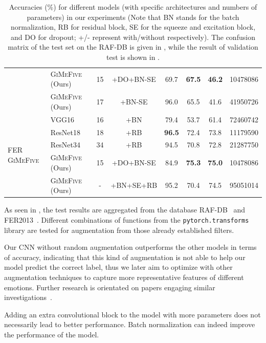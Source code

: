 \begin{table}[ht]
\begin{tabular}{@{}llcccccr@{}}
    &\textsc{GiMeFive} (Ours) & 15 & +DO+BN-SE & 69.7 & \textbf{67.5} & \textbf{46.2} & 10478086 \\
    &\textsc{GiMeFive} (Ours) & 17 & +BN-SE & 96.0 & 65.5 & 41.6 & 41950726 \\
    \midrule
    \midrule
    \multirow{5}{*}{FER \textsc{GiMeFive}} & VGG16~\cite{SimonyanZ14a} & 16 & +BN & 79.4 & 53.7 & 61.4 & 72460742 \\
    & ResNet18~\cite{HeZRS16} & 18 & +RB  & \textbf{96.5} & 72.4 & 73.8 & 11179590 \\
    & ResNet34~\cite{HeZRS16} & 34 & +RB  & 94.5 & 70.8 & 72.8 & 21287750 \\
    &\textsc{GiMeFive} (Ours) & 15 & +DO+BN-SE & 84.9 & \textbf{75.3} & \textbf{75.0} & 10478086 \\
    &\textsc{GiMeFive} (Ours) & - & +BN+SE+RB & 95.2 & 70.4 & 74.5 & 95051014 \\
    \bottomrule
  \end{tabular}
  \caption{Accuracies (\%) for different models (with specific architectures and numbers of parameters) in our experiments 
  (Note that BN stands for the batch normalization, 
  RB for residual block, 
  SE for the squeeze and excitation block, 
  and DO for dropout; 
  +/- represent with/without respectively). 
  The confusion matrix of the test set on the RAF-DB is given in , 
  while the result of validation test is shown in .} 
  \label{tab:model}
\end{table}

As seen in , 
the test results are aggregated from the database RAF-DB~\cite{kaggle_rafdb} and FER2013~\cite{kaggle_fer}.
Different combinations of functions from the \texttt{pytorch.transforms} library are tested for augmentation from those already established filters. 

Our CNN without random augmentation outperforms the other models in terms of accuracy, 
indicating that this kind of augmentation is not able to help our model predict the correct label, 
thus we later aim to optimize with other augmentation techniques to capture more representative features of different emotions.
Further research is orientated on papers engaging similar investigations~\cite{ZeilerF14,li_reliable_2017,VermaMRMV23}.

Adding an extra convolutional block to the model with more parameters does not necessarily lead to better performance.
Batch normalization can indeed improve the performance of the model. 

